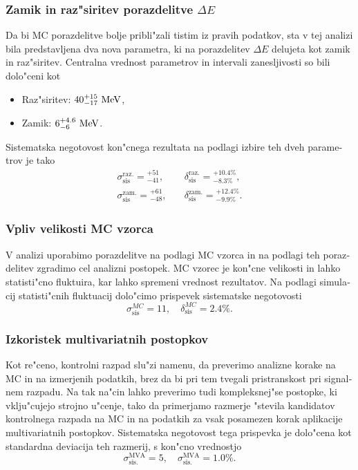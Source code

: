 \begin{otherlanguage}{slovene}
\subsubsection{Zamik in raz"siritev porazdelitve $\Delta E$}

Da bi MC porazdelitve bolje pribli"zali tistim iz pravih podatkov, sta v tej analizi bila predstavljena dva nova parametra, ki na porazdelitev $\Delta E$ delujeta kot zamik in raz"siritev. Centralna vrednost parametrov in intervali zanesljivosti so bili dolo"ceni kot
\begin{itemize}
	\item Raz"siritev: $40_{-17}^{+15}\mathrm{~MeV}$,
	\item Zamik: $6_{-6}^{+4.6}\mathrm{~MeV}$.
\end{itemize}
Sistematska negotovost kon"cnega rezultata na podlagi izbire teh dveh parametrov je tako
\begin{align}
\sigma_{\mathrm{sis}}^{\mathrm{raz.}} = {}^{+51}_{-41},&\quad \delta_{\mathrm{sis}}^{\mathrm{raz.}} = {}^{+10.4\%}_{-8.3\%}, \\
\sigma_{\mathrm{sis}}^{\mathrm{zam.}} = {}^{+61}_{-48},&\quad \delta_{\mathrm{sis}}^{\mathrm{zam.}} = {}^{+12.4\%}_{-9.9\%}.
\end{align}

\subsubsection{Vpliv velikosti MC vzorca}
V analizi uporabimo porazdelitve na podlagi MC vzorca in na podlagi teh porazdelitev zgradimo cel analizni postopek. MC vzorec je kon"cne velikosti in lahko statisti"cno fluktuira, kar lahko spremeni vrednost rezultatov. Na podlagi simulacij statisti"cnih fluktuacij dolo"cimo prispevek sistematske negotovosti
\begin{equation}
\sigma_{\mathrm{sis}}^{MC} = 11,\quad \delta_{\mathrm{sis}}^{MC} = 2.4\%.
\end{equation}


\subsubsection{Izkoristek multivariatnih postopkov}
Kot re"ceno, kontrolni razpad slu"zi namenu, da preverimo analizne korake na MC in na izmerjenih podatkih, brez da bi pri tem tvegali pristranskost pri signalnem razpadu. Na tak na"cin lahko preverimo tudi kompleksnej"se postopke, ki vklju"cujejo strojno u"cenje, tako da primerjamo razmerje "stevila kandidatov kontrolnega razpada na MC in na podatkih za vsak posamezen korak aplikacije multivariatnih postopkov. Sistematska negotovost tega prispevka je dolo"cena kot standardna deviacija teh razmerij, s kon"cno vrednostjo
\begin{equation}
\sigma_{\mathrm{sis.}}^{\mathrm{MVA}} = 5,\quad\sigma_{\mathrm{sis.}}^{\mathrm{MVA}} = 1.0\%.
\end{equation}


\end{otherlanguage}
